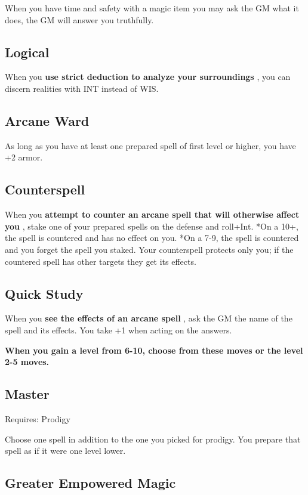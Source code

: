  When you have time and safety with a magic item you may ask the GM what it does, the GM will answer you truthfully.
\subsection{Logical}


 When you \textbf{use strict deduction to analyze your surroundings}
, you can discern realities with INT instead of WIS.
\subsection{Arcane Ward}


 As long as you have at least one prepared spell of first level or higher, you have +2 armor.
\subsection{Counterspell}


 When you \textbf{attempt to counter an arcane spell that will otherwise affect you}
, stake one of your prepared spells on the defense and roll+Int. *On a 10+, the spell is countered and has no effect on you. *On a 7-9, the spell is countered and you forget the spell you staked. Your counterspell protects only you; if the countered spell has other targets they get its effects.
\subsection{Quick Study}


 When you \textbf{see the effects of an arcane spell}
, ask the GM the name of the spell and its effects. You take +1 when acting on the answers.


\vspace{\baselineskip}
 {\bfseries When you gain a level from 6-10, choose from these moves or the level 2-5 moves.}
\subsection{Master}


 Requires: Prodigy


 Choose one spell in addition to the one you picked for prodigy. You prepare that spell as if it were one level lower.
\subsection{Greater Empowered Magic}


